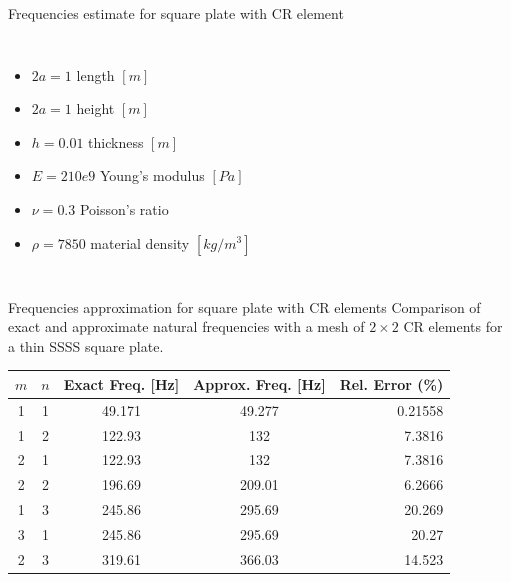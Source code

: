 \documentclass[aspectratio=169]{beamer}
\begin{document}
\begin{frame}{Frequencies estimate for square plate with CR element}
\begin{columns}
    {\begin{itemize}\setlength\itemsep{0.05em}
        \item $2a=1$ length $[m]$
        \item $2a=1$ height $[m]$
        \item $h=0.01$ thickness $[m]$
        \item $E=210e9$ Young's modulus $[Pa]$
        \item $\nu=0.3$ Poisson's ratio
        \item $\rho=7850$ material density $[kg/m^3]$
      \end{itemize}}
  \end{columns}
\end{frame}


\begin{frame}{Frequencies approximation for square plate with CR elements}
  \vspace{-1cm}
  Comparison of exact and approximate natural frequencies with a mesh of $2\times 2$ CR elements for a thin SSSS square plate.
  \vspace{0.3cm}
  \begin{table}[h!]
    \centering
    \label{tab:freq_comparison_CR}
    \begin{tabular}{ccccr}
      \hline
      $m$ & $n$ & Exact Freq. [Hz] & Approx. Freq. [Hz] & Rel. Error (\%) \\
      \hline
      1   & 1   & 49.171           & 49.277             & 0.21558         \\
      1   & 2   & 122.93           & 132                & 7.3816          \\
      2   & 1   & 122.93           & 132                & 7.3816          \\
      2   & 2   & 196.69           & 209.01             & 6.2666          \\
      1   & 3   & 245.86           & 295.69             & 20.269          \\
      3   & 1   & 245.86           & 295.69             & 20.27           \\
      2   & 3   & 319.61           & 366.03             & 14.523          \\
      \hline
    \end{tabular}
  \end{table}
\end{frame}
\end{document}
